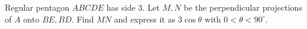 Regular pentagon $ABCDE$ has side $3$. Let $M,N$ be the perpendicular projections of $A$ onto $BE,BD$. Find $MN$ and express it as $3\cos\theta$ with $0<\theta<90^\circ$.
